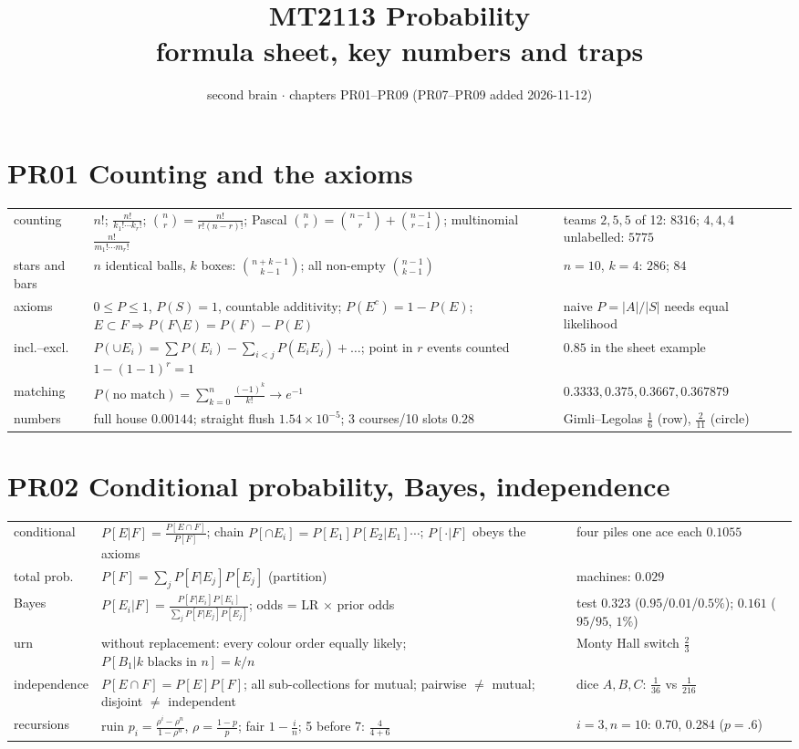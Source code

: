 \documentclass[9pt]{article}
\title{MT2113 Probability\\\large formula sheet, key numbers and traps}
\author{second brain $\cdot$ chapters PR01--PR09 (PR07--PR09 added 2026-11-12)}
\date{}
\begin{document}
\maketitle
\vspace{-2.2em}

\section*{PR01 Counting and the axioms}
\begin{tabular}{@{}p{2.9cm}p{8.4cm}p{6.1cm}@{}}
\toprule
counting & $n!$; $\tfrac{n!}{k_1!\cdots k_r!}$; $\binom nr=\tfrac{n!}{r!(n-r)!}$; Pascal $\binom nr=\binom{n-1}r+\binom{n-1}{r-1}$; multinomial $\tfrac{n!}{m_1!\cdots m_r!}$ & teams $2,5,5$ of 12: $8316$; $4,4,4$ unlabelled: $5775$\\
stars and bars & $n$ identical balls, $k$ boxes: $\binom{n+k-1}{k-1}$; all non-empty $\binom{n-1}{k-1}$ & $n=10$, $k=4$: $286$; $84$\\
axioms & $0\le P\le1$, $P(S)=1$, countable additivity; $P(E^c)=1-P(E)$; $E\subset F\Rightarrow P(F\setminus E)=P(F)-P(E)$ & naive $P=|A|/|S|$ needs equal likelihood\\
incl.--excl. & $P(\cup E_i)=\sum P(E_i)-\sum_{i<j}P(E_iE_j)+\dots$; point in $r$ events counted $1-(1-1)^r=1$ & $0.85$ in the sheet example\\
matching & $P(\text{no match})=\sum_{k=0}^n\tfrac{(-1)^k}{k!}\to e^{-1}$ & $0.3333,0.375,0.3667,0.367879$\\
numbers & full house $0.00144$; straight flush $1.54\times10^{-5}$; 3 courses/10 slots $0.28$ & Gimli--Legolas $\tfrac16$ (row), $\tfrac2{11}$ (circle)\\
\bottomrule
\end{tabular}

\section*{PR02 Conditional probability, Bayes, independence}
\begin{tabular}{@{}p{2.9cm}p{8.4cm}p{6.1cm}@{}}
\toprule
conditional & $P[E|F]=\tfrac{P[E\cap F]}{P[F]}$; chain $P[\cap E_i]=P[E_1]P[E_2|E_1]\cdots$; $P[\cdot|F]$ obeys the axioms & four piles one ace each $0.1055$\\
total prob. & $P[F]=\sum_jP[F|E_j]P[E_j]$ (partition) & machines: $0.029$\\
Bayes & $P[E_i|F]=\tfrac{P[F|E_i]P[E_i]}{\sum_jP[F|E_j]P[E_j]}$; odds = LR $\times$ prior odds & test $0.323$ ($0.95$/$0.01$/$0.5\%$); $0.161$ ($95/95$, $1\%$)\\
urn & without replacement: every colour order equally likely; $P[B_1|k\text{ blacks in }n]=k/n$ & Monty Hall switch $\tfrac23$\\
independence & $P[E\cap F]=P[E]P[F]$; all sub-collections for mutual; pairwise $\ne$ mutual; disjoint $\ne$ independent & dice $A,B,C$: $\tfrac1{36}$ vs $\tfrac1{216}$\\
recursions & ruin $p_i=\tfrac{\rho^i-\rho^n}{1-\rho^n}$, $\rho=\tfrac{1-p}p$; fair $1-\tfrac in$; 5 before 7: $\tfrac4{4+6}$ & $i=3,n=10$: $0.70$, $0.284$ ($p=.6$)\\
\bottomrule
\end{tabular}
\end{document}
